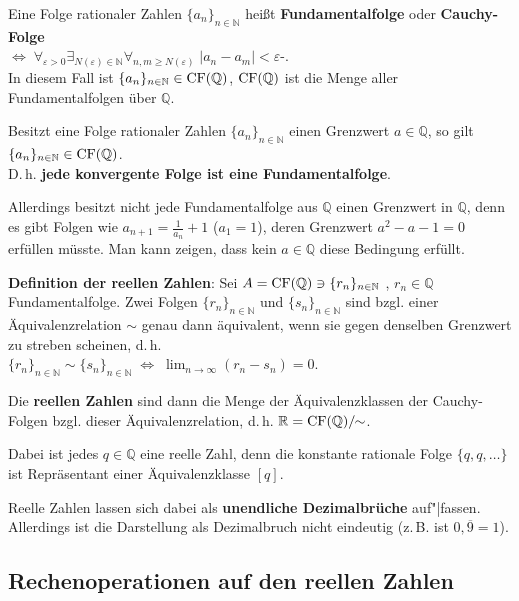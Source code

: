 Eine Folge rationaler Zahlen $\{a_n\}_{n \in \mathbb{N}}$ heißt
\textbf{Fundamentalfolge} oder \textbf{Cauchy-Folge} \\
$\Leftrightarrow\; \forall_{\varepsilon > 0}
\exists_{N(\varepsilon) \in \mathbb{N}} \forall_{n,m \ge N(\varepsilon)}\;
|a_n - a_m| < \varepsilon$-. \\
In diesem Fall ist $\{a_n\}_{n \in \mathbb{N}} \in \operatorname{CF}(\mathbb{Q})$,
$\operatorname{CF}(\mathbb{Q})$ ist die Menge aller Fundamentalfolgen über
$\mathbb{Q}$.

Besitzt eine Folge rationaler Zahlen $\{a_n\}_{n \in \mathbb{N}}$ einen
Grenzwert $a \in \mathbb{Q}$, so gilt
$\{a_n\}_{n \in \mathbb{N}} \in \operatorname{CF}(\mathbb{Q})$. \\
D.\,h. \textbf{jede konvergente Folge ist eine Fundamentalfolge}.

Allerdings besitzt nicht jede Fundamentalfolge aus $\mathbb{Q}$ einen Grenzwert
in $\mathbb{Q}$, denn es gibt Folgen wie $a_{n+1} = \frac{1}{a_n} + 1$
($a_1 = 1$), deren Grenzwert $a^2 - a - 1 = 0$ erfüllen müsste. Man kann
zeigen, dass kein $a \in \mathbb{Q}$ diese Bedingung erfüllt.

\linie

\textbf{Definition der reellen Zahlen}: Sei $A = \operatorname{CF}(\mathbb{Q})
\ni \{r_n\}_{n \in \mathbb{N}}$ , $r_n \in \mathbb{Q}$ Fundamentalfolge. Zwei
Folgen $\{r_n\}_{n \in \mathbb{N}}$ und $\{s_n\}_{n \in \mathbb{N}}$ sind bzgl.
einer Äquivalenzrelation $\sim$ genau dann äquivalent, wenn sie gegen denselben
Grenzwert zu streben scheinen, d.\,h. \\
$\{r_n\}_{n \in \mathbb{N}} \sim \{s_n\}_{n \in \mathbb{N}}
\;\Leftrightarrow\; \lim_{n \to \infty} (r_n - s_n) = 0$.

Die \textbf{reellen Zahlen} sind dann die Menge der Äquivalenzklassen der
Cauchy-Folgen bzgl. dieser Äquivalenzrelation, d.\,h.
$\mathbb{R} = \operatorname{CF}(\mathbb{Q})/\!\!\sim$.

Dabei ist jedes $q \in \mathbb{Q}$ eine reelle Zahl, denn die konstante
rationale Folge $\{q, q, \ldots\}$ ist Repräsentant einer Äquivalenzklasse
$[q]$.

Reelle Zahlen lassen sich dabei als \textbf{unendliche Dezimalbrüche}
auf"|fassen. Allerdings ist die Darstellung als Dezimalbruch nicht eindeutig
(z.\,B. ist $0,\overline{9} = 1$).

\pagebreak

\subsection{%
    Rechenoperationen auf den reellen Zahlen%
}

